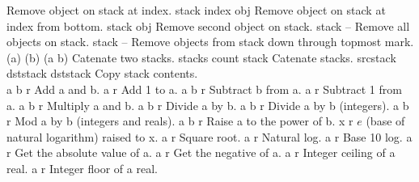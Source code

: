 \begin{longtable}{}
	{Remove object on stack at index.}
\hline
\optableent
	{stack index}
	{{\bf {}}}
	{obj}
	{Remove object on stack at index from bottom.}
\hline
\optableent
	{stack}
	{{\bf {}}}
	{obj}
	{Remove second object on stack.}
\hline
\optableent
	{stack}
	{{\bf {}}}
	{--}
	{Remove all objects on stack.}
\hline
\optableent
	{stack}
	{{\bf {}}}
	{--}
	{Remove objects from stack down through topmost mark.}
\hline
\optableent
	{(a) (b)}
	{{\bf {}}}
	{(a b)}
	{Catenate two stacks.}
\hline
\optableent
	{stacks count}
	{{\bf {}}}
	{stack}
	{Catenate stacks.}
\hline
\optableent
	{srcstack dststack}
	{{\bf {}}}
	{dststack}
	{Copy stack contents.}
\hline \hline
{} \\
\hline \hline
\optableent
	{a b}
	{{\bf {}}}
	{r}
	{Add a and b.}
\hline
\optableent
	{a}
	{{\bf {}}}
	{r}
	{Add 1 to a.}
\hline
\optableent
	{a b}
	{{\bf {}}}
	{r}
	{Subtract b from a.}
\hline
\optableent
	{a}
	{{\bf {}}}
	{r}
	{Subtract 1 from a.}
\hline
\optableent
	{a b}
	{{\bf {}}}
	{r}
	{Multiply a and b.}
\hline
\optableent
	{a b}
	{{\bf {}}}
	{r}
	{Divide a by b.}
\hline
\optableent
	{a b}
	{{\bf {}}}
	{r}
	{Divide a by b (integers).}
\hline
\optableent
	{a b}
	{{\bf {}}}
	{r}
	{Mod a by b (integers and reals).}
\hline
\optableent
	{a b}
	{{\bf {}}}
	{r}
	{Raise a to the power of b.}
\hline
\optableent
	{x}
	{{\bf {}}}
	{r}
	{$e$ (base of natural logarithm) raised to x.}
\hline
\optableent
	{a}
	{{\bf {}}}
	{r}
	{Square root.}
\hline
\optableent
	{a}
	{{\bf {}}}
	{r}
	{Natural log.}
\hline
\optableent
	{a}
	{{\bf {}}}
	{r}
	{Base 10 log.}
\hline
\optableent
	{a}
	{{\bf {}}}
	{r}
	{Get the absolute value of a.}
\hline
\optableent
	{a}
	{{\bf {}}}
	{r}
	{Get the negative of a.}
\hline
\optableent
	{a}
	{{\bf {}}}
	{r}
	{Integer ceiling of a real.}
\hline
\optableent
	{a}
	{{\bf {}}}
	{r}
	{Integer floor of a real.}

\end{longtable}
